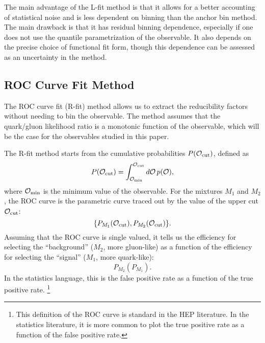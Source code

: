 \documentclass[aps,prd,twocolumn,preprintnumbers,nofootinbib,longbibliography,floatfix]{revtex4-1}
\newcommand{\figO}{\mathcal{O}}
\begin{document}
The main advantage of the L-fit method is that it allows for a better accounting of statistical noise and is less dependent on binning than the anchor bin method.
%
The main drawback is that it has residual binning dependence, especially if one does not use the quantile parametrization of the observable.
%
It also depends on the precise choice of functional fit form, though this dependence can be assessed as an uncertainty in the method.






\subsection{ROC Curve Fit Method}
\label{subsection:roc}

The ROC curve fit (R-fit) method allows us to extract the reducibility factors without needing to bin the observable.
%
The method assumes that the quark/gluon likelihood ratio is a monotonic function of the observable, which will be the case for the observables studied in this paper.


The R-fit method starts from the cumulative probabilities $P(\figO_{\rm cut})$, defined as
%
\begin{equation}
P(\figO_{\rm cut}) = \int_{\figO_{\rm min}}^{\figO_{\rm cut}} d\figO \, p(\figO),
\end{equation}
%
where $\figO_{\rm min}$ is the minimum value of the observable.
%
For the mixtures $M_1$ and $M_2$, the ROC curve is the parametric curve traced out by the value of the upper cut $\figO_{\rm cut}$:
%
\begin{equation}
\label{eq:mix_ROC}
\{P_{M_1}(\figO_{\rm cut}), P_{M_2}(\figO_{\rm cut})\}.
\end{equation}
%
Assuming that the ROC curve is single valued, it tells us the efficiency for selecting the ``background'' ($M_2$, more gluon-like) as a function of the efficiency for selecting the ``signal'' ($M_1$, more quark-like):
%
\begin{equation}
P_{M_2} (P_{M_1}).
\end{equation}
%
In the statistics language, this is the false positive rate as a function of the true positive rate.%
%
\footnote{This definition of the ROC curve is standard in the HEP literature.
%
In the statistics literature, it is more common to plot the true positive rate as a function of the false positive rate.}
\end{document}
